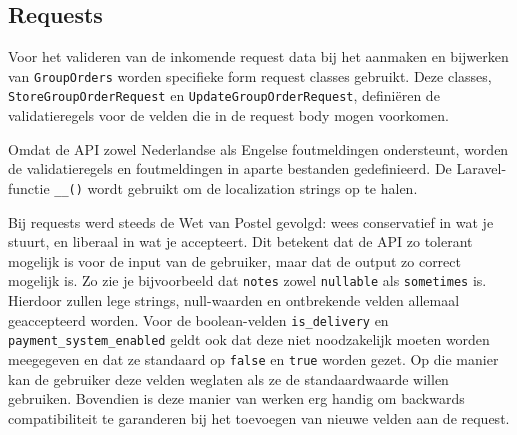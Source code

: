 \subsection{Requests}

Voor het valideren van de inkomende request data bij het aanmaken en bijwerken van \texttt{GroupOrders} worden specifieke form request classes gebruikt. Deze classes, \texttt{StoreGroupOrderRequest} en \texttt{UpdateGroupOrderRequest}, definiëren de validatieregels voor de velden die in de request body mogen voorkomen.

\bigskip

Omdat de API zowel Nederlandse als Engelse foutmeldingen ondersteunt, worden de validatieregels en foutmeldingen in aparte bestanden gedefinieerd. De Laravel-functie \texttt{\_\_()} wordt gebruikt om de localization strings op te halen.

\bigskip

Bij requests werd steeds de Wet van Postel gevolgd: wees conservatief in wat je stuurt, en liberaal in wat je accepteert. Dit betekent dat de API zo tolerant mogelijk is voor de input van de gebruiker, maar dat de output zo correct mogelijk is. Zo zie je bijvoorbeeld dat \texttt{notes} zowel \texttt{nullable} als \texttt{sometimes} is. Hierdoor zullen lege strings, null-waarden en ontbrekende velden allemaal geaccepteerd worden. Voor de boolean-velden \texttt{is\_delivery} en \texttt{payment\_system\_enabled} geldt ook dat deze niet noodzakelijk moeten worden meegegeven en dat ze standaard op \texttt{false} en \texttt{true} worden gezet. Op die manier kan de gebruiker deze velden weglaten als ze de standaardwaarde willen gebruiken. Bovendien is deze manier van werken erg handig om backwards compatibiliteit te garanderen bij het toevoegen van nieuwe velden aan de request.

